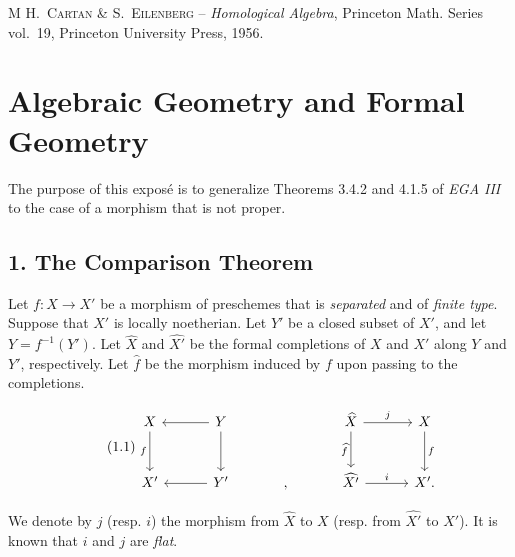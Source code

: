 \documentclass[11pt,a4paper,oneside]{book}
\providecommand{\chapterspace}[1]{}
\providecommand{\refname}{Bibliography}
\theoremstyle{plain}
\theoremstyle{definition}
\theoremstyle{remark}
\begin{document}
\begingroup

\renewcommand{\refname}{Bibliography}
\begin{thebibliography}{M}
\textsc{H.~Cartan \& S.~Eilenberg} -- \emph{Homological Algebra},
Princeton Math. Series vol.~19, Princeton University Press, 1956.
\end{thebibliography}
\endgroup


\makeatletter
\providecommand{\sgareaderlabel}[2]{%
  \begingroup
  \def\@currentlabel{#2}%
  \phantomsection\label{#1}%
  \endgroup}
\makeatother

\chapterspace{-1}
\chapter{Algebraic Geometry and Formal Geometry}
\label{IX}

\medskip
The purpose of this expos\'e is to generalize Theorems 3.4.2 and 4.1.5 of
\emph{EGA III} to the case of a morphism that is not proper.

\section*{1. The Comparison Theorem}
\sgareaderlabel{IX.1}{1}

Let $f\colon X\to X'$ be a morphism of preschemes that is
\emph{separated} and of \emph{finite type}. Suppose that $X'$ is locally
noetherian. Let $Y'$ be a closed subset of $X'$, and let
$Y=f^{-1}(Y')$. Let $\widehat X$ and $\widehat{X'}$ be the formal
completions of $X$ and $X'$ along $Y$ and $Y'$, respectively. Let
$\widehat f$ be the morphism induced by $f$ upon passing to the completions.

\begin{equation}
\tag{1.1}\label{eq:IX.1.1}
\begin{tikzcd}[column sep=3.1em,row sep=2.6em]
X \arrow[d,"f"'] & Y \arrow[l] \arrow[d] &&
\widehat{X} \arrow[d,"\widehat f"'] \arrow[r,"j"] & X \arrow[d,"f"] \\
X' & Y' \arrow[l] & {,} &
\widehat{X'} \arrow[r,"i"] & X'.
\end{tikzcd}
\end{equation}

We denote by $j$ (resp. $i$) the morphism from $\widehat X$ to $X$
(resp. from $\widehat{X'}$ to $X'$). It is known that $i$ and $j$ are
\emph{flat}.
\end{document}
